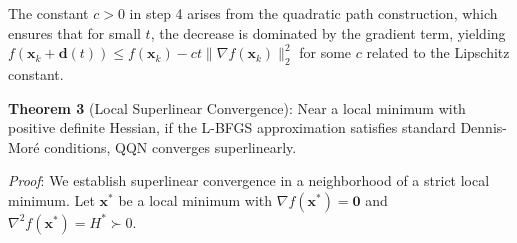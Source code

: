 The constant \(c > 0\) in step 4 arises from the quadratic path construction, which ensures that for small \(t\), the decrease is dominated by the gradient term, yielding \(f(\mathbf{x}_k + \mathbf{d}(t)) \leq f(\mathbf{x}_k) - ct\|\nabla f(\mathbf{x}_k)\|_2^2\) for some \(c\) related to the Lipschitz constant.

\textbf{Theorem 3} (Local Superlinear Convergence): Near a local minimum with positive definite Hessian, if the L-BFGS approximation satisfies standard Dennis-Moré conditions, QQN converges superlinearly.

\emph{Proof}: We establish superlinear convergence in a neighborhood of a strict local minimum. Let \(\mathbf{x}^*\) be a local minimum with \(\nabla f(\mathbf{x}^*) = \mathbf{0}\) and \(\nabla^2 f(\mathbf{x}^*) = H^* \succ 0\).


